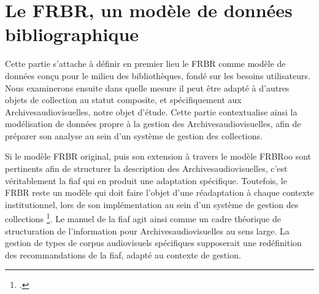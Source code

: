 \chapter{\label{I_1}Le \gls{FRBR}, un modèle de données bibliographique}


Cette partie s’attache à définir en premier lieu le \gls{FRBR} comme modèle de données conçu pour le milieu des bibliothèques, fondé sur les besoins utilisateurs. Nous examinerons ensuite dans quelle mesure il peut être adapté à d'autres objets de collection au statut composite, et spécifiquement aux \gls{Archivesaudiovisuelles}, notre objet d'étude. Cette partie contextualise ainsi la modélisation de données propre à la gestion des \gls{Archivesaudiovisuelles}, afin de préparer son analyse au sein d'un système de gestion des collections.









Si le modèle \gls{FRBR} original, puis son extension à travers le modèle \gls{FRBRoo} sont pertinents afin de structurer la description des \gls{Archivesaudiovisuelles}, c'est véritablement la \gls{fiaf} qui en produit une adaptation spécifique. Toutefois, le \gls{FRBR} reste un modèle qui doit faire l'objet d'une réadaptation à chaque contexte institutionnel, lors de son implémentation au sein d'un système de gestion des collections \footcite{boeuf2008}. Le manuel de la \gls{fiaf} agit ainsi comme un cadre théorique de structuration de l'information pour \gls{Archivesaudiovisuelles} au sens large. La gestion de types de corpus audiovisuels spécifiques supposerait une redéfinition des recommandations de la \gls{fiaf}, adapté au contexte de gestion.




